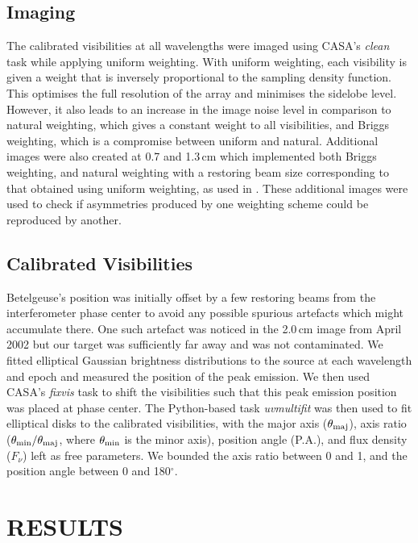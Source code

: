 \documentclass[iop]{emulateapj}
\begin{document}
\subsection{Imaging}
The calibrated visibilities at all wavelengths were imaged using CASA's \textit{clean} task while applying uniform weighting. With uniform weighting, each visibility is given a weight that is inversely proportional to the sampling density function. This optimises the full resolution of the array and minimises the sidelobe level. However, it also leads to an increase in the image noise level in comparison to natural weighting, which gives a constant weight to all visibilities, and Briggs weighting, which is a compromise between uniform and natural. Additional images were also created at 0.7 and 1.3\,cm which implemented both Briggs weighting, and natural weighting with a restoring beam size corresponding to that obtained using uniform weighting, as used in \cite{lim_1998}. These additional images were used to check if asymmetries produced by one weighting scheme could be reproduced by another.

\subsection{Calibrated Visibilities}
Betelgeuse's position was initially offset by a few restoring beams from the interferometer phase center to avoid any possible spurious artefacts which might accumulate there. One such artefact was noticed in the 2.0\,cm image from April 2002 but our target was sufficiently far away and was not contaminated. We fitted elliptical Gaussian brightness distributions to the source at each wavelength and epoch and measured the position of the peak emission. We then used CASA's \textit{fixvis} task to shift the visibilities such that this peak emission position was placed at phase center. The Python-based task \textit{uvmultifit} \citep{marti_vidal_2014} was then used to fit elliptical disks to the calibrated visibilities, with the major axis ($\theta _{\rm{maj}}$), axis ratio ($\theta _{\rm{min}}/\theta _{\rm{maj}}$, where $\theta _{\rm{min}}$ is the minor axis), position angle (P.A.), and flux density ($F_{\nu}$) left as free parameters. We bounded the axis ratio between 0 and 1, and the position angle between 0 and 180$^{\circ}$.

\section{RESULTS} 
\end{document}

